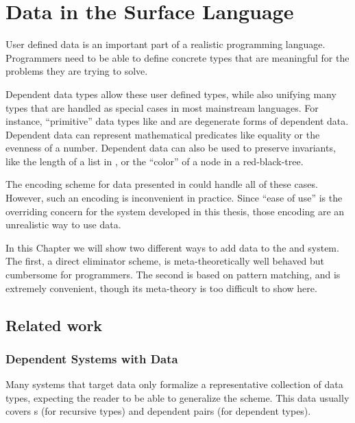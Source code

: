 \chapter{Data in the Surface Language}
\label{chapter:SurfaceData}
\thispagestyle{myheadings}


User defined data is an important part of a realistic programming language.
Programmers need to be able to define concrete types that are meaningful for the problems they are trying to solve.

Dependent data types allow these user defined types, while also unifying many types that are handled as special cases in most mainstream languages.
For instance, ``primitive'' data types like \Nat{} and \Bool{} are degenerate forms of dependent data.
Dependent data can represent mathematical predicates like equality or the evenness of a number.
Dependent data can also be used to preserve invariants, like the length of a list in \Vect{}, or the ``color'' of a node in a red-black-tree.

The encoding scheme for data presented in  could handle all of these cases.
However, such an encoding is inconvenient in practice.
Since ``ease of use'' is the overriding concern for the system developed in this thesis, those encoding are an unrealistic way to use data.

In this Chapter we will show two different ways to add data to the \slang{} and \bidir{} system.
The first, a direct eliminator scheme, is meta-theoretically well behaved but cumbersome for programmers.
The second is based on pattern matching, and is extremely convenient, though its meta-theory is too difficult to show here.






\section{Related work}

\subsection{Dependent Systems with Data}

Many systems that target data only formalize a representative collection of data types, expecting the reader to be able to generalize the scheme.
This data usually covers \Nat{}s (for recursive types) and dependent pairs (for dependent types). %

